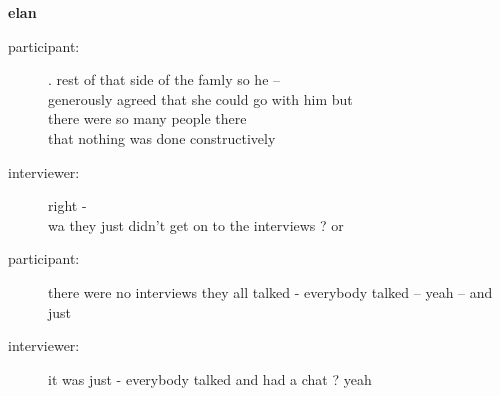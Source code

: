 \documentclass{article}
\newcommand{\turn}[2]{
\item[#1:] #2
}
\begin{document}
\begin{center}\textbf{elan}\end{center}

\begin{description}

\turn{participant}{. rest of that side of the famly so he --\\
generously agreed that she could go with him but\\
there were so many people there\\
that nothing was done constructively}

\turn{interviewer}{right -\\
wa they just didn't get on to the interviews ? or}

\turn{participant}{there were no interviews they all talked - everybody talked -- yeah -- and just}

\turn{interviewer}{it was just - everybody talked and had a chat ? yeah}


\end{description}
\end{document}
